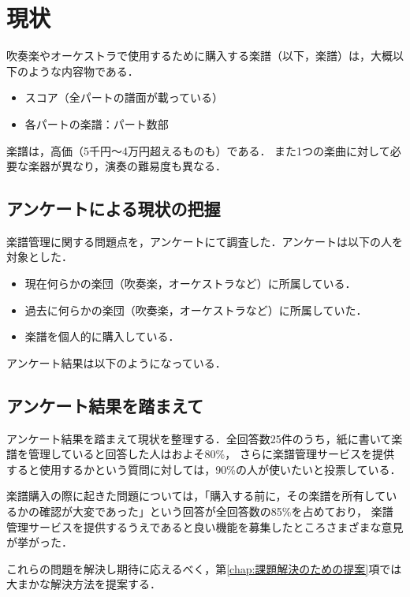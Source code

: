 \chapter{現状}
吹奏楽やオーケストラで使用するために購入する楽譜（以下，楽譜）は，大概以下のような内容物である．
\begin{itemize}
    \item スコア（全パートの譜面が載っている）
    \item 各パートの楽譜：パート数部
\end{itemize}
楽譜は，高価（5千円〜4万円超えるものも）である．
また1つの楽曲に対して必要な楽器が異なり，演奏の難易度も異なる．
\section{アンケートによる現状の把握}
楽譜管理に関する問題点を，アンケートにて調査した．アンケートは以下の人を対象とした．
\begin{itemize}
    \item 現在何らかの楽団（吹奏楽，オーケストラなど）に所属している．
    \item 過去に何らかの楽団（吹奏楽，オーケストラなど）に所属していた．
    \item 楽譜を個人的に購入している．
\end{itemize}
アンケート結果は以下のようになっている．

\section{アンケート結果を踏まえて}\label{chap:issues}
アンケート結果を踏まえて現状を整理する．全回答数25件のうち，紙に書いて楽譜を管理していると回答した人はおよそ80\%，
さらに楽譜管理サービスを提供すると使用するかという質問に対しては，90\%の人が使いたいと投票している．\par
楽譜購入の際に起きた問題については，「購入する前に，その楽譜を所有しているかの確認が{{大変}}であった」という回答が全回答数の85\%を占めており，
楽譜管理サービスを提供するうえであると良い機能を募集したところさまざまな意見が挙がった．\par
これらの問題を解決し期待に応えるべく，第\ref{chap:課題解決のための提案}項では大まかな解決方法を提案する．